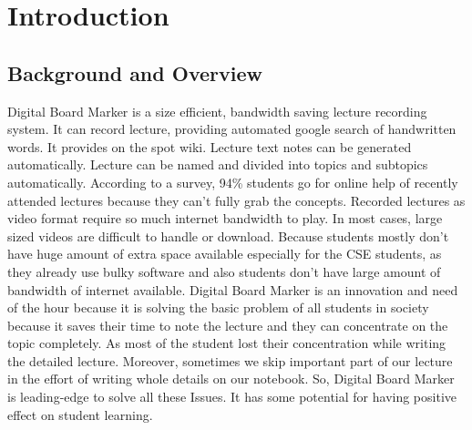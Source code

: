 
\chapter{Introduction} %
\label{Chapter1}
\section{Background and Overview}
Digital Board Marker is a size efficient, bandwidth saving lecture recording system. It can record lecture, providing automated google search of handwritten words. It provides on the spot wiki. Lecture text notes can be generated automatically. Lecture can be named and divided into topics and subtopics automatically. According to a survey, 94\% students go for online help of recently attended lectures because they can’t fully grab the concepts. Recorded lectures as video format require so much internet bandwidth to play. In most cases, large sized videos are difficult to handle or download. Because students mostly don’t have huge amount of extra space available especially for the CSE students, as they already use bulky software and also students don’t have large amount of bandwidth of internet available.
Digital Board Marker is an innovation and need of the hour because it is solving the basic problem of all students in society because it saves their time to note the lecture and they can concentrate on the topic completely. As most of the student lost their concentration while writing the detailed lecture. Moreover, sometimes we skip important part of our lecture in the effort of writing whole details on our notebook. So, Digital Board Marker is leading-edge to solve all these Issues. It has some potential for having positive effect on student learning.

